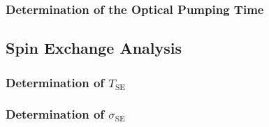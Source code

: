 \subsubsection{Determination of the Optical Pumping Time}

\subsection{Spin Exchange Analysis}

\subsubsection{Determination of $T_{\mathrm{SE}}$}

\subsubsection{Determination of $\sigma_{\mathrm{SE}}$}